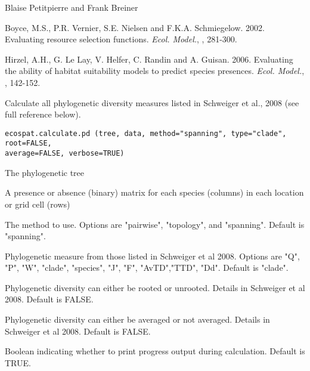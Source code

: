 \documentclass[a4paper]{book}
\begin{document}
%
\begin{Author}\relax
Blaise Petitpierre  and Frank Breiner 
\end{Author}
%
\begin{References}\relax
Boyce, M.S., P.R. Vernier, S.E. Nielsen and F.K.A. Schmiegelow. 2002. Evaluating resource selection functions. \emph{Ecol. Model.}, , 281-300.

Hirzel, A.H., G. Le Lay, V. Helfer, C. Randin and A. Guisan. 2006. Evaluating the ability of habitat suitability models to predict species presences. \emph{Ecol. Model.}, , 142-152.
\end{References}
%
\begin{Examples}
\end{Examples}
%
\begin{Description}\relax
Calculate all phylogenetic diversity measures listed in Schweiger et al., 2008 (see full reference below).
\end{Description}
%
\begin{Usage}
\begin{verbatim}
ecospat.calculate.pd (tree, data, method="spanning", type="clade", root=FALSE, 
average=FALSE, verbose=TRUE)
\end{verbatim}
\end{Usage}
%
\begin{Arguments}
\begin{ldescription}
\item[\code{tree}] The phylogenetic tree
\item[\code{data}] A presence or absence (binary) matrix for each species (columns) in each location or grid cell (rows)
\item[\code{method}] The method to use. Options are "pairwise", "topology", and "spanning". Default is "spanning".
\item[\code{type}] Phylogenetic measure from those listed in Schweiger et al 2008. Options are "Q", "P", "W", "clade", "species", "J", "F", "AvTD","TTD", "Dd". Default is "clade".
\item[\code{root}] Phylogenetic diversity can either be rooted or unrooted. Details in Schweiger et al 2008. Default is FALSE.
\item[\code{average}] Phylogenetic diversity can either be averaged or not averaged. Details in Schweiger et al 2008. Default is FALSE.
\item[\code{verbose}] Boolean indicating whether to print progress output during calculation. Default is TRUE.
\end{ldescription}
\end{Arguments}
\end{document}
